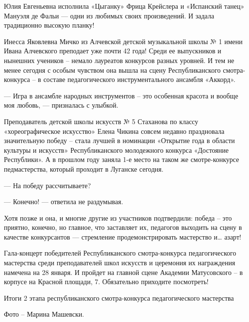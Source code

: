 Юлия Евгеньевна исполнила «Цыганку» Фрица Крейслера и «Испанский танец» Мануэля
де Фальи — одни из любимых своих произведений. И задала традиционно высокую
планку!

Инесса Яковлевна Мичко из Алчевской детской музыкальной школы № 1 имени Ивана
Алчевского преподает уже почти 42 года! Среди ее выпускников и нынешних
учеников – немало лауреатов конкурсов разных уровней. И тем не менее сегодня с
особым чувством она вышла на сцену Республиканского смотра-конкурса – в составе
педагогического инструментального ансамбля «Аккорд».

— Игра в ансамбле народных инструментов – это особенная красота и вообще моя
любовь, — призналась с улыбкой.

Преподаватель детской школы искусств № 5 Стаханова по классу «хореографическое
искусство» Елена Чикина совсем недавно праздновала значительную победу – стала
лучшей в номинации «Открытие года в области культуры и искусств»
Республиканского молодежного конкурса «Достояние Республики». А в прошлом году
заняла 1-е место на таком же смотре-конкурсе педмастерства, который проходит в
Луганске сегодня.

— На победу рассчитываете?

— Конечно! — ответила не раздумывая.

Хотя позже и она, и многие другие из участников подтвердили: победа – это
приятно, конечно, но главное, что заставляет их, педагогов выходить на сцену в
качестве конкурсантов — стремление продемонстрировать мастерство и… азарт!

Гала-концерт победителей Республиканского смотра-конкурса педагогического
мастерства среди преподавателей школ искусств и церемония их награждения
намечена на 28 января. И пройдет на главной сцене Академии Матусовского – в
корпусе на Красной площади, 7. Обязательно приходите посмотреть!

Итоги 2 этапа республиканского смотра-конкурса педагогического мастерства

Фото – Марина Машевски.
